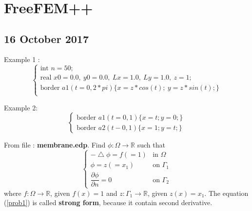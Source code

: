 \documentclass[a4paper,10pt]{article}
\begin{document}
\section{FreeFEM++}

\subsection{16 October 2017}
Example 1 :
\begin{equation}\nonumber
\begin{cases}
\text{int } n=50;\\
\text{real } x0=0.0 ,\ y0=0.0 ,\ Lx=1.0 ,\ Ly=1.0 ,\ z=1; \\
\text{border } a1(t=0, 2*pi) \{x=z*cos(t); \ y=z*sin(t); \}\\
\end{cases}
\end{equation}

\vspace{4cm}

Example 2:
\begin{equation}\nonumber
\begin{cases}
\text{border } a1(t=0,1) \{ x=t;y=0; \}\\
\text{border } a2(t-0,1) \{ x=1;y=t; \}
\end{cases}
\end{equation}

\vspace{4cm}

From file : \textbf{membrane.edp}. Find $ \phi : \Omega \rightarrow \mathbb{R} $ such that
\begin{equation}\label{prob1}
\begin{cases}
-\bigtriangleup \phi = f (=1) & \text{in } \Omega \\
\phi = z (=x_{1}) & \text{on } \Gamma_{1} \\
\dfrac{\partial \phi}{\partial n} = 0 & \text{on } \Gamma_{2}
\end{cases}
\end{equation}
where $ f : \Omega \rightarrow \mathbb{R} $, given $ f(x)=1 $ and $ z : \Gamma_{1} \rightarrow \mathbb{R} $, given $ z(x)=x_{1} $. The equation (\ref{prob1}) is called \textbf{strong form}, because it contain second derivative.

\vspace{4cm}
\end{document}
